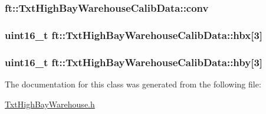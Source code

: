 \subsubsection[{\texorpdfstring{conv}{conv}}]{ ft\+::\+Txt\+High\+Bay\+Warehouse\+Calib\+Data\+::conv}\hypertarget{classft_1_1_txt_high_bay_warehouse_calib_data_a978a3f44d70956000e110a66b17cf36e}{}\label{classft_1_1_txt_high_bay_warehouse_calib_data_a978a3f44d70956000e110a66b17cf36e}
\subsubsection[{\texorpdfstring{hbx}{hbx}}]{\setlength{\rightskip}{0pt plus 5cm}uint16\+\_\+t ft\+::\+Txt\+High\+Bay\+Warehouse\+Calib\+Data\+::hbx\mbox{[}3\mbox{]}}\hypertarget{classft_1_1_txt_high_bay_warehouse_calib_data_a90910cc5144915878a613a9a248ea66f}{}\label{classft_1_1_txt_high_bay_warehouse_calib_data_a90910cc5144915878a613a9a248ea66f}
\subsubsection[{\texorpdfstring{hby}{hby}}]{\setlength{\rightskip}{0pt plus 5cm}uint16\+\_\+t ft\+::\+Txt\+High\+Bay\+Warehouse\+Calib\+Data\+::hby\mbox{[}3\mbox{]}}\hypertarget{classft_1_1_txt_high_bay_warehouse_calib_data_a6f12021cef4ed3d547cfade44616c15f}{}\label{classft_1_1_txt_high_bay_warehouse_calib_data_a6f12021cef4ed3d547cfade44616c15f}


The documentation for this class was generated from the following file\+:\begin{DoxyCompactItemize}
\item 
\hyperlink{_txt_high_bay_warehouse_8h}{Txt\+High\+Bay\+Warehouse.\+h}\end{DoxyCompactItemize}
